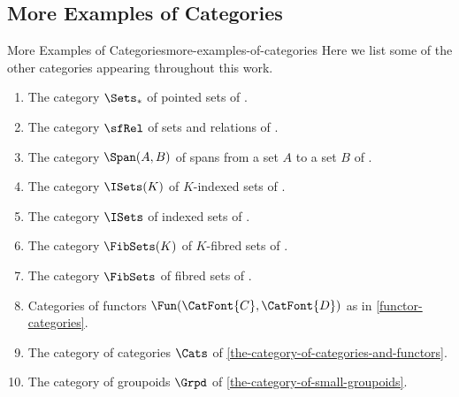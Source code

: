 \subsection{More Examples of Categories}\label{subsection-more-examples-of-categories}
\begin{example}{More Examples of Categories}{more-examples-of-categories}%
    Here we list some of the other categories appearing throughout this work.
    \begin{enumerate}
        \item\label{more-examples-of-categories-pointed-sets}The category $\Sets_{*}$ of pointed sets of .
        \item\label{more-examples-of-categories-relations}The category $\sfRel$ of sets and relations of .
        \item\label{more-examples-of-categories-spans}The category $\Span(A,B)$ of spans from a set $A$ to a set $B$ of .
        \item\label{more-examples-of-categories-indexed-sets-k}The category $\ISets(K)$ of $K$-indexed sets of .
        \item\label{more-examples-of-categories-indexed-sets}The category $\ISets$ of indexed sets of .
        \item\label{more-examples-of-categories-fibred-sets-k}The category $\FibSets(K)$ of $K$-fibred sets of .
        \item\label{more-examples-of-categories-fibred-sets}The category $\FibSets$ of fibred sets of .
        \item\label{more-examples-of-categories-functor-categories}Categories of functors $\Fun(\CatFont{C},\CatFont{D})$ as in \cref{functor-categories}.
        \item\label{more-examples-of-categories-categories}The category of categories $\Cats$ of \cref{the-category-of-categories-and-functors}.
        \item\label{more-examples-of-categories-groupoids}The category of groupoids $\Grpd$ of \cref{the-category-of-small-groupoids}.
    \end{enumerate}
\end{example}
